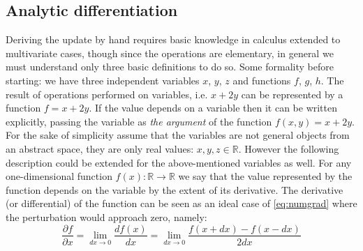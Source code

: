 \subsection{Analytic differentiation}
Deriving the update by hand requires basic knowledge in calculus extended to multivariate cases, though since the operations are elementary, in general we must understand only three basic definitions to do so. 
Some formality before starting: we have three independent variables $x$, $y$, $z$ and functions $f$, $g$, $h$. The result of operations performed on variables, i.e. $x+2y$ can be represented by a function $f=x+2y$. 
If the value depends on a variable then it can be written explicitly, passing the variable as \emph{the argument} of the function $f(x,y)=x+2y$. 
For the sake of simplicity assume that the variables are not general objects from an abstract space, they are only real values: $x,y,z\in \mathbb{R}$. However the following description could be extended for the above-mentioned variables as well. For any one-dimensional function $f(x):\mathbb{R}\rightarrow\mathbb{R}$ we say that the value represented by the function depends on the variable by the extent of its derivative. The derivative (or differential) of the function can be seen as an ideal case of \ref{eq:numgrad} where the perturbation would approach zero, namely:
\begin{equation}
    \frac{\partial f}{\partial x} = \lim_{dx\rightarrow 0}\frac{df(x)}{dx}= \lim_{dx\rightarrow 0} \frac{f(x+dx)-f(x-dx)}{2dx}
\end{equation}
